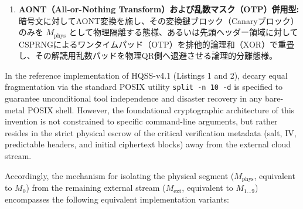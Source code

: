 \documentclass[11pt,a4paper,titlepage]{article}
\begin{document}
\begin{enumerate}
    連続した先頭ブロックの切断にとどまらず、暗号化ストリーム全体から所定のストライド間隔（例：偶数バイト／奇数バイト、あるいは $S$ バイトおきの特定バイトプレーン）でデータを抜き出して $M_{\text{phys}}$ を構成する。クラウド側には歯抜けとなった暗号文が残り、CBC等の暗号ブロックチェーン結合性が暗号文全体にわたって数学的に破綻するため、クラウド単体データに対するいかなる暗号解読操作も成立しない。
  \item \textbf{AONT（All-or-Nothing Transform）および乱数マスク（OTP）併用型:}
    暗号文に対してAONT変換を施し、その変換鍵ブロック（Canaryブロック）のみを $M_{\text{phys}}$ として物理隔離する態様、あるいは先頭ヘッダー領域に対してCSPRNGによるワンタイムパッド（OTP）を排他的論理和（XOR）で重畳し、その解読用乱数パッドを物理QR側へ退避させる論理的分離態様。
\end{enumerate}
\else
In the reference implementation of HQSS-v4.1 (Listings 1 and 2), decary equal fragmentation via the standard POSIX utility \texttt{split -n 10 -d} is specified to guarantee unconditional tool independence and disaster recovery in any bare-metal POSIX shell. However, the foundational cryptographic architecture of this invention is not constrained to specific command-line arguments, but rather resides in the strict physical escrow of the critical verification metadata (salt, IV, predictable headers, and initial ciphertext blocks) away from the external cloud stream.

Accordingly, the mechanism for isolating the physical segment ($M_{\text{phys}}$, equivalent to $M_0$) from the remaining external stream ($M_{\text{ext}}$, equivalent to $M_{1\dots9}$) encompasses the following equivalent implementation variants:
\end{document}
